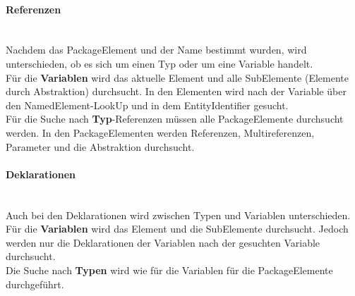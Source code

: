 \documentclass[./einleitung.tex]{subfiles}
\begin{document}
    \paragraph{Referenzen}\mbox{}\\
    Nachdem das PackageElement und der Name bestimmt wurden, wird unterschieden, ob es sich um einen Typ oder um eine Variable handelt.
    \\
    Für die \textbf{Variablen} wird das aktuelle Element und alle SubElemente (Elemente durch Abstraktion) durchsucht.
    In den Elementen wird nach der Variable über den NamedElement-LookUp und in dem EntityIdentifier gesucht.
    \\
    Für die Suche nach \textbf{Typ}-Referenzen müssen alle PackageElemente durchsucht werden.
    In den PackageElementen werden Referenzen, Multireferenzen, Parameter und die Abstraktion durchsucht.

    \paragraph{Deklarationen}\mbox{}\\
    Auch bei den Deklarationen wird zwischen Typen und Variablen unterschieden. \\
    Für die \textbf{Variablen} wird das Element und die SubElemente durchsucht.
    Jedoch werden nur die Deklarationen der Variablen nach der gesuchten Variable durchsucht.\\
    Die Suche nach \textbf{Typen} wird wie für die Variablen für die PackageElemente durchgeführt.
\end{document}
